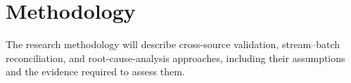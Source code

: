 \section{Methodology}
\label{sec:methodology}
The research methodology will describe cross-source validation,
stream--batch reconciliation, and root-cause-analysis approaches,
including their assumptions and the evidence required to assess them.
